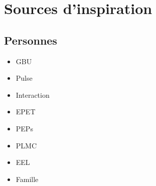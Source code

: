 \section{Sources d'inspiration}

	\subsection{Personnes}
	
	\begin{itemize}
	\item GBU %
	\item Pulse %
	\item Interaction %
	\item EPET %
	\item PEPs %
	\item PLMC
	\item EEL %
	\item Famille %
	\end{itemize}
